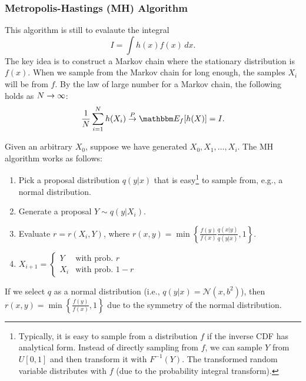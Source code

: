    \subsubsection{Metropolis-Hastings (MH) Algorithm}
        This algorithm is still to evalaute the integral
            \begin{equation}
                I = \int h(x) f(x) \, d x.
            \end{equation}
        The key idea is to construct a Markov chain where the stationary distribution is $f(x)$.
        When we sample from the Markov chain for long enough, the samples $X_i$ will be from $f$.
        By the law of large number for a Markov chain, the following holds as $N \rightarrow \infty$: 
            \begin{equation}
                \frac{1}{\ndata}\sum_{i=1}^{\ndata}{h(X_i)} \stackrel{P}{\rightarrow} \E_{f}[h(X)] = I.
            \end{equation}

        Given an arbitrary $X_0$, suppose we have generated $X_0, X_1, \ldots, X_i$.
        The MH algorithm works as follows:
            \begin{enumerate}
                \item Pick a proposal distribution $q(y|x)$ that is easy\footnote{Typically, it is easy to sample from a distribution $f$ if the inverse CDF has analytical form. 
                Instead of directly sampling from $f$, we can sample $Y$ from $U[0, 1]$ and then transform it with $F^{-1}(Y)$. The transformed random variable distributes with $f$ (due to the probability integral transform). } to sample from, e.g., a normal distribution. 
                \item Generate a proposal $Y \sim q(y | X_i)$.
                \item Evaluate $r=r(X_i, Y)$, where $r(x, y) = \min\left\{ \frac{f(y)}{f(x)}\frac{q(x|y)}{q(y|x)}, 1\right\}$.
                \item $X_{i+1} = \begin{cases} Y & \text{with prob. } r \\ X_i & \text{with prob. } 1-r  \end{cases}$
            \end{enumerate}

        If we select $q$ as a normal distribution (i.e., $q(y|x) = \mathcal{N}(x, b^2)$), then  $r(x, y) = \min \left\{ \frac{f(y)}{f(x)}, 1 \right\}$ due to the symmetry of the normal distribution.
            
